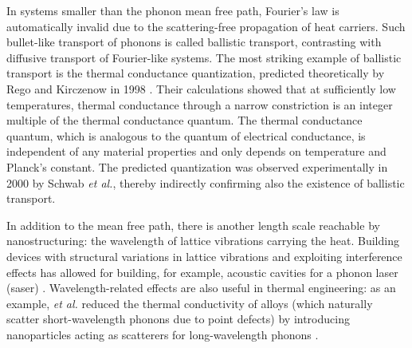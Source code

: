 In systems smaller than the phonon mean free path, Fourier's law is automatically invalid due to the scattering-free propagation of heat carriers. Such bullet-like transport of phonons is called ballistic transport, contrasting with diffusive transport of Fourier-like systems. The most striking example of ballistic transport is the thermal conductance quantization, predicted theoretically by Rego and Kirczenow in 1998 \cite{rego98}. Their calculations showed that at sufficiently low temperatures, thermal conductance through a narrow constriction is an integer multiple of the thermal conductance quantum. The thermal conductance quantum, which is analogous to the quantum of electrical conductance, is independent of any material properties and only depends on temperature and Planck's constant. The predicted quantization was observed experimentally in 2000 by Schwab \textit{et al.}, thereby indirectly confirming also the existence of ballistic transport.

In addition to the mean free path, there is another length scale reachable by nanostructuring: the wavelength of lattice vibrations carrying the heat. Building devices with structural variations in lattice vibrations and exploiting interference effects has allowed for building, for example, acoustic cavities for a phonon laser (saser) \cite{maryam13}. Wavelength-related effects are also useful in thermal engineering: as an example, \textit{et al.} reduced the thermal conductivity of alloys (which naturally scatter short-wavelength phonons due to point defects) by introducing nanoparticles acting as scatterers for long-wavelength phonons \cite{}. 






